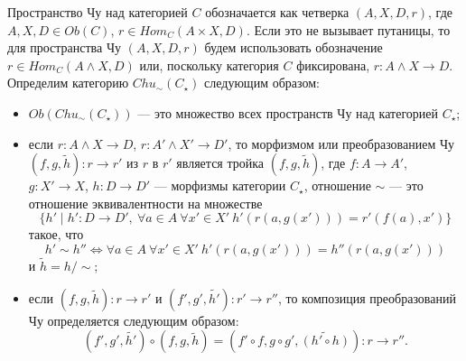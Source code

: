 \documentclass[a4paper,12pt]{article}
\begin{document}
\begin{itemize}
    Пространство Чу над категорией $C$ обозначается как четверка $(A,X,D,r)$, где $A,X,D \in Ob(C)$, $r \in Hom_C(A \times X, D)$. Если это не вызывает путаницы, то для пространства Чу $(A,X,D,r)$ будем использовать обозначение $r \in Hom_C(A \wedge X,D)$ или, поскольку категория $C$ фиксирована, $r: A \wedge X \to D$. Определим категорию $Chu_\sim(C_\star)$ следующим образом:
    \begin{itemize}
        \item $Ob(Chu_\sim(C_\star))$ --- это множество всех пространств Чу над категорией $C_\star$;
        \item если $r: A \wedge X \to D$, $r: A' \wedge X' \to D'$, то морфизмом или преобразованием Чу $(f,g,\widetilde{h}): r \to r'$ из $r$ в $r'$ является тройка $(f,g,\widetilde{h})$, где $f: A \to A'$, $g: X' \to X$, $h: D \to D'$ --- морфизмы категории $C_\star$, отношение $\sim$ --- это отношение эквивалентности на множестве
        $$
            \{h' \mid h': D \to D',\ \forall a \in A\ \forall x' \in X'\ h'(r(a,g(x'))) = r'(f(a),x')\}
        $$
        такое, что
        $$
            h' \sim h'' \Leftrightarrow \forall a \in A\ \forall x' \in X'\ h'(r(a,g(x'))) = h''(r(a,g(x')))
        $$
        и $\widetilde{h} = h/\sim$;
        \item если $(f,g,\widetilde{h}): r \to r'$ и $(f',g',\widetilde{h'}): r' \to r''$, то композиция преобразований Чу определяется следующим образом:
        $$
            (f',g',\widetilde{h'}) \circ (f,g,\widetilde{h}) = (f' \circ f, g \circ g', \widetilde{(h' \circ h)}): r \to r''.
        $$
    \end{itemize}
\end{itemize}
\end{document}
